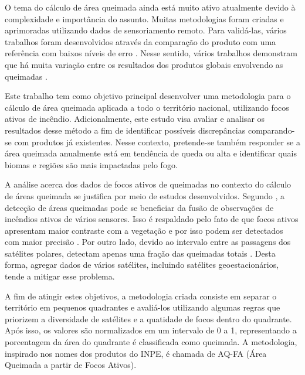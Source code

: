 \documentclass[cic,tc]{iiufrgs}
\begin{document}
O tema do cálculo de área queimada ainda está muito ativo atualmente devido à complexidade e importância do assunto. Muitas metodologias foram criadas e aprimoradas utilizando dados de sensoriamento remoto. Para validá-las, vários 
trabalhos foram desenvolvidos através da comparação do produto com uma referência com baixos níveis de erro \citep{BOSCHETTI2016465, BOSCHETTI2019111490}. Nesse sentido, vários trabalhos demonstram que há muita variação entre os resultados dos produtos globais envolvendo as queimadas \citep{Boschetti2004, Humber2019}. 

Este trabalho tem como objetivo principal desenvolver uma metodologia para o cálculo de área queimada aplicada a todo o território nacional, utilizando focos ativos de incêndio. Adicionalmente, este estudo visa avaliar e analisar os resultados desse método a fim de identificar possíveis discrepâncias comparando-se com produtos já existentes. Nesse contexto, pretende-se também responder se a área queimada anualmente está em tendência de queda ou alta e identificar quais biomas e regiões são mais impactadas pelo fogo.


A análise acerca dos dados de focos ativos de queimadas no contexto do cálculo de áreas queimada se justifica por meio de estudos desenvolvidos. Segundo \citet{giglio2010assessing}, a detecção de áreas queimadas pode se beneficiar da fusão de observações de incêndios ativos de vários sensores. Isso é respaldado pelo fato de que focos ativos apresentam maior contraste com a vegetação e por isso podem ser detectados com maior precisão \citep{GIGLIO2016}. Por outro lado, devido ao intervalo entre as passagens dos satélites polares, detectam apenas uma fração das queimadas totais \citep{HANTSON2013, giglio2009active}. Desta forma, agregar dados de vários satélites, incluindo satélites geoestacionários, tende a mitigar esse problema.


A fim de atingir estes objetivos, a metodologia criada consiste em separar o território em pequenos quadrantes e avaliá-los utilizando algumas regras que priorizem a diversidade de satélites e a quatidade de focos dentro do quadrante. Após isso, os valores são normalizados em um intervalo de 0 a 1, representando a porcentagem da área do quadrante é classificada como queimada. A metodologia, inspirado nos nomes dos produtos do INPE, é chamada de AQ-FA (Área Queimada a partir de Focos Ativos).
\end{document}
